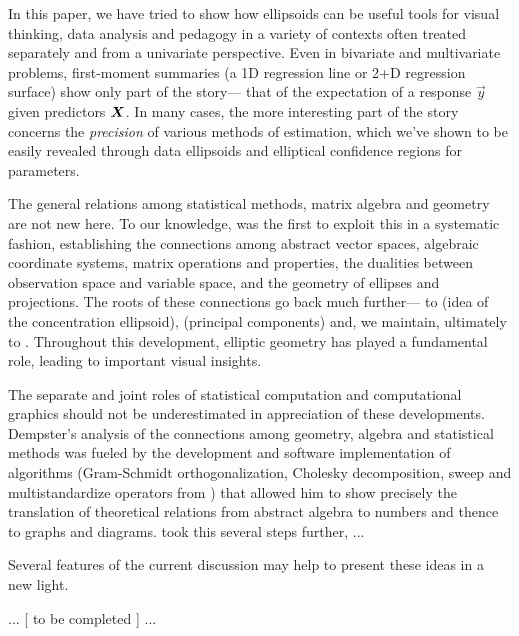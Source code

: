 In this paper, we have tried to show how ellipsoids can be useful tools for
visual thinking, data analysis and pedagogy in a variety of contexts often
treated separately and from a univariate perspective.  Even in bivariate 
and multivariate problems, first-moment summaries (a 1D regression line
or 2+D regression surface) show only part of the story--- that of the
expectation of a response $\vec{y}$ given predictors $\bm{X}$.
In many cases, the more interesting part of the story concerns the 
\emph{precision} of various methods of estimation, which we've shown
to be easily revealed through data ellipsoids and
elliptical confidence regions for parameters.

The general relations among statistical methods, matrix algebra and geometry are
not new here.  To our knowledge, \citet{Dempster:69} was the first to exploit this
in a systematic fashion, establishing the connections among abstract vector spaces,
algebraic coordinate systems, matrix operations and properties, the dualities
between observation space and variable space,
 and the geometry
of ellipses and projections.%
The roots of these connections go back much further---
to 
\citet{Cramer:1946} (idea of the concentration ellipsoid),
\citet{Hotelling:1933} (principal components)
and, we maintain, ultimately to \citet{Galton:1886}.
Throughout this development, elliptic geometry has played 
a fundamental role, leading to important visual insights.

The separate and joint roles of statistical computation and computational graphics should not be underestimated
in appreciation of these developments.  Dempster's analysis of the connections among geometry, algebra and
statistical methods was fueled by the development and software implementation of algorithms 
(Gram-Schmidt orthogonalization, Cholesky decomposition, sweep and multistandardize operators from
\citet{Beaton:64})
that allowed him to show precisely the translation of theoretical relations
from abstract algebra to numbers and thence to graphs and diagrams.  \citet{Monette:90}
took this several steps further, ...
 

Several features of the current discussion may help to present these ideas in a
new light.  

... [ to be completed ] ...




